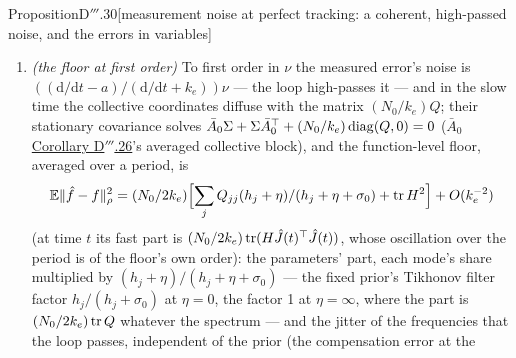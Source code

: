 \begin{thm}{Proposition}{D$'''$.30}[measurement noise at perfect tracking: a coherent, high-passed noise, and the
errors in variables]
\begin{enumerate}[label=\textup{(\roman*)}]
    noisy class trajectory, and to second order in $\nu$ its mean drift is
    $\E[\varepsilon_m^2]G^{1/2}\partial_x\nabla^2_\vartheta\tilde\Phi G^{1/2}
    + \E[e]G^{1/2}\nabla^2_\vartheta\tilde\Phi G^{1/2}$ (the measured regressor; the parameters' cross term
    negligible), $\E[e]$ the mean tracking error. At the lift --- the parameters at their atoms, $\E[e]$ the noise's
    own mean error at fixed parameters --- its period average $S_k$ gives the decay rate
    $\sigma_0/k_e - \E\nu^2\lambda_{\max}(S_k)$ to leading order, so near the lift the replicated configuration
    attracts --- and an $m$-system started near it follows the $K_0$-atom loop --- only below the noise level
    $\E\nu^2 = (\sigma_0/k_e)/\max_k\lambda_{\max}(S_k)$. Along the noisy trajectory $\E[e]$ also carries the mean
    tracking error $-\hat J\bar y(t)/k_e$ of the developing errors-in-variables deviation $\bar y(t)$ of (iii), of the
    same order in $\E\nu^2$, so the drift $S_k(t)$ changes on $\bar y$'s time scale and to this order the separation
    follows $\dot u = (\E\nu^2S_k(t) - \sigma_0/k_e)u$ (the first-order multiplicative noise, high-passed by the loop,
    adds a negligible cumulant to its exponent); the long-time threshold --- where $\bar y$ is $O(1)$ at these noise
    levels and the expansion no longer applies --- is open.
  \item \emph{(the floor at first order)} To first order in $\nu$ the measured error's noise is
    $((\mathrm{d}/\mathrm{d}t - a)/(\mathrm{d}/\mathrm{d}t + k_e))\nu$ --- the loop high-passes it --- and in the slow
    time the collective coordinates diffuse with the matrix $(N_0/k_e)Q$; their stationary covariance solves
    $\bar A_0\Sigma + \Sigma\bar A_0^\top + (N_0/k_e)\operatorname{diag}(Q,0) = 0$ ($\bar A_0$
    \hyperref[res:thmDppp:26]{Corollary D$'''$.26}'s averaged collective block), and the function-level floor,
    averaged over a period, is
    \[
      \mathbb{E}\lVert \hat f - f\rVert^2_\rho = (N_0/2k_e)\Bigl[\sum_jQ_{jj}(h_j + \eta)/(h_j + \eta + \sigma_0) + \operatorname{tr} H^2\Bigr]
      + O(k_e^{-2})
    \]
    (at time $t$ its fast part is $(N_0/2k_e)\operatorname{tr}(H\hat J(t)^\top\hat J(t))$, whose oscillation over the period is of
    the floor's own order): the parameters' part, each mode's share multiplied by
    $(h_j + \eta)/(h_j + \eta + \sigma_0)$ --- the fixed prior's Tikhonov filter factor $h_j/(h_j + \sigma_0)$ at
    $\eta = 0$, the factor 1 at $\eta = \infty$, where the part is $(N_0/2k_e)\operatorname{tr} Q$ whatever the spectrum --- and
    the jitter of the frequencies that the loop passes, independent of the prior (the compensation error at the

\end{enumerate}
\end{thm}
